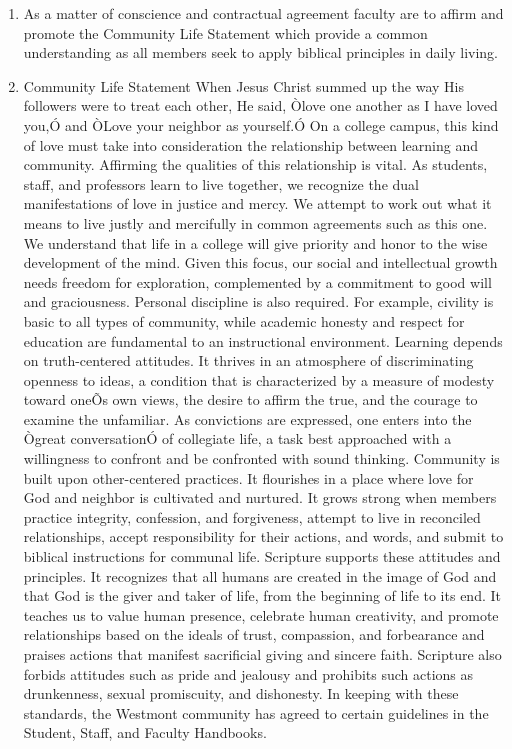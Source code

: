 \documentclass[letterpaper, 11pt]{article}
\begin{document}
				\begin{enumerate}[label=\alph*)]
					\item{As a matter of conscience and contractual agreement faculty are to affirm and promote the Community Life Statement which provide a common understanding as all members seek to apply biblical principles in daily living.}
					\item{Community Life Statement
						When Jesus Christ summed up the way His followers were to treat each other, He said, Òlove one another as I have loved you,Ó and ÒLove your neighbor as yourself.Ó  On a college campus, this kind of love must take into consideration the relationship between learning and community.
						Affirming the qualities of this relationship is vital.  As students, staff, and professors learn to live together, we recognize the dual manifestations of love in justice and mercy.  We attempt to work out what it means to live justly and mercifully in common agreements such as this one.  We understand that life in a college will give priority and honor to the wise development of the mind.
						Given this focus, our social and intellectual growth needs freedom for exploration, complemented by a commitment to good will and graciousness.  Personal discipline is also required.  For example, civility is basic to all types of community, while academic honesty and respect for education are fundamental to an instructional environment.
						Learning depends on truth-centered attitudes.  It thrives in an atmosphere of discriminating openness to ideas, a condition that is characterized by a measure of modesty toward oneÕs own views, the desire to affirm the true, and the courage to examine the unfamiliar.  As convictions are expressed, one enters into the Ògreat conversationÓ of collegiate life, a task best approached with a willingness to confront and be confronted with sound thinking.
						Community is built upon other-centered practices.  It flourishes in a place where love for God and neighbor is cultivated and nurtured.  It grows strong when members practice integrity, confession, and forgiveness, attempt to live in reconciled relationships, accept responsibility for their actions, and words, and submit to biblical instructions for communal life.
						Scripture supports these attitudes and principles.  It recognizes that all humans are created in the image of God and that God is the giver and taker of life, from the beginning of life to its end.  It teaches us to value human presence, celebrate human creativity, and promote relationships based on the ideals of trust, compassion, and forbearance and praises actions that manifest sacrificial giving and sincere faith.  Scripture also forbids attitudes such as pride and jealousy and prohibits such actions as drunkenness, sexual promiscuity, and dishonesty.  In keeping with these standards, the Westmont community has agreed to certain guidelines in the Student, Staff, and Faculty Handbooks.
}
\end{enumerate}
\end{document}
